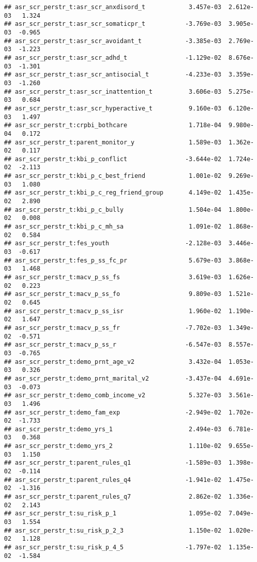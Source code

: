 \documentclass[
]{article}
\begin{document}
\begin{verbatim}
## asr_scr_perstr_t:asr_scr_anxdisord_t            3.457e-03  2.612e-03   1.324
## asr_scr_perstr_t:asr_scr_somaticpr_t           -3.769e-03  3.905e-03  -0.965
## asr_scr_perstr_t:asr_scr_avoidant_t            -3.385e-03  2.769e-03  -1.223
## asr_scr_perstr_t:asr_scr_adhd_t                -1.129e-02  8.676e-03  -1.301
## asr_scr_perstr_t:asr_scr_antisocial_t          -4.233e-03  3.359e-03  -1.260
## asr_scr_perstr_t:asr_scr_inattention_t          3.606e-03  5.275e-03   0.684
## asr_scr_perstr_t:asr_scr_hyperactive_t          9.160e-03  6.120e-03   1.497
## asr_scr_perstr_t:crpbi_bothcare                 1.718e-04  9.980e-04   0.172
## asr_scr_perstr_t:parent_monitor_y               1.589e-03  1.362e-02   0.117
## asr_scr_perstr_t:kbi_p_conflict                -3.644e-02  1.724e-02  -2.113
## asr_scr_perstr_t:kbi_p_c_best_friend            1.001e-02  9.269e-03   1.080
## asr_scr_perstr_t:kbi_p_c_reg_friend_group       4.149e-02  1.435e-02   2.890
## asr_scr_perstr_t:kbi_p_c_bully                  1.504e-04  1.800e-02   0.008
## asr_scr_perstr_t:kbi_p_c_mh_sa                  1.091e-02  1.868e-02   0.584
## asr_scr_perstr_t:fes_youth                     -2.128e-03  3.446e-03  -0.617
## asr_scr_perstr_t:fes_p_ss_fc_pr                 5.679e-03  3.868e-03   1.468
## asr_scr_perstr_t:macv_p_ss_fs                   3.619e-03  1.626e-02   0.223
## asr_scr_perstr_t:macv_p_ss_fo                   9.809e-03  1.521e-02   0.645
## asr_scr_perstr_t:macv_p_ss_isr                  1.960e-02  1.190e-02   1.647
## asr_scr_perstr_t:macv_p_ss_fr                  -7.702e-03  1.349e-02  -0.571
## asr_scr_perstr_t:macv_p_ss_r                   -6.547e-03  8.557e-03  -0.765
## asr_scr_perstr_t:demo_prnt_age_v2               3.432e-04  1.053e-03   0.326
## asr_scr_perstr_t:demo_prnt_marital_v2          -3.437e-04  4.691e-03  -0.073
## asr_scr_perstr_t:demo_comb_income_v2            5.327e-03  3.561e-03   1.496
## asr_scr_perstr_t:demo_fam_exp                  -2.949e-02  1.702e-02  -1.733
## asr_scr_perstr_t:demo_yrs_1                     2.494e-03  6.781e-03   0.368
## asr_scr_perstr_t:demo_yrs_2                     1.110e-02  9.655e-03   1.150
## asr_scr_perstr_t:parent_rules_q1               -1.589e-03  1.398e-02  -0.114
## asr_scr_perstr_t:parent_rules_q4               -1.941e-02  1.475e-02  -1.316
## asr_scr_perstr_t:parent_rules_q7                2.862e-02  1.336e-02   2.143
## asr_scr_perstr_t:su_risk_p_1                    1.095e-02  7.049e-03   1.554
## asr_scr_perstr_t:su_risk_p_2_3                  1.150e-02  1.020e-02   1.128
## asr_scr_perstr_t:su_risk_p_4_5                 -1.797e-02  1.135e-02  -1.584

\end{verbatim}
\end{document}
